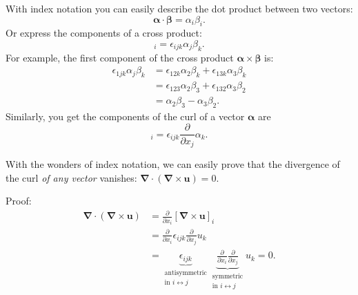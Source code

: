 With index notation you can easily describe the dot product between two vectors:
    \begin{equation}
            \boldsymbol{\alpha} \cdot \boldsymbol{\beta} = \alpha_i \beta_i.
    \end{equation}
Or express the components of a cross product:
    \begin{equation}
            [\boldsymbol{\alpha} \times \boldsymbol{\beta} ]_i = \epsilon_{ijk} \alpha_j \beta_k.
    \end{equation}        
For example, the first component of the cross product $\boldsymbol{\alpha} \times \boldsymbol{\beta}$ is:
\begin{equation}
    \begin{aligned}
           \epsilon_{1jk} \alpha_j \beta_k &= \epsilon_{12k} \alpha_2 \beta_k + \epsilon_{13k} \alpha_3 \beta_k \\
            &= \epsilon_{123} \alpha_2 \beta_3 + \epsilon_{132} \alpha_3 \beta_2 \\
            &= \alpha_2 \beta_3 - \alpha_3 \beta_2.
        \end{aligned}
    \end{equation}
Similarly, you get the components of the curl of a vector $\boldsymbol{\alpha}$ are
    \begin{equation}
         [\boldsymbol{\nabla} \times \boldsymbol{\alpha} ]_i = \epsilon_{ijk} \frac{\partial }{\partial x_j}\alpha_k.
    \end{equation}

With the wonders of index notation, we can easily prove that the divergence of the curl \emph{of any vector} vanishes: $\boldsymbol{\nabla}\cdot (\boldsymbol{\nabla} \times \boldsymbol{u})=0$.

Proof:
  \begin{align}
     \boldsymbol{\nabla}\cdot (\boldsymbol{\nabla} \times \boldsymbol{u}) &=\frac{\partial}{\partial x_i}[\boldsymbol{\nabla} \times \boldsymbol{u}]_i \nonumber\\
        &= \frac{\partial}{\partial x_i} \epsilon_{ijk} \frac{\partial}{\partial x_j} u_k \nonumber\\
        &= \underbrace{\epsilon_{ijk}}_{\substack{\textrm{antisymmetric}\\\textrm{in $i\leftrightarrow j$}}}\underbrace{\frac{\partial}{\partial x_i}\frac{\partial}{\partial x_j}}_{\substack{\textrm{symmetric}\\\textrm{in $i\leftrightarrow j$}}}u_k = 0.
    \end{align}
    
